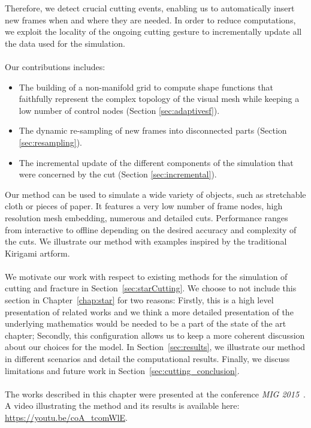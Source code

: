 Therefore, we detect crucial cutting events, enabling us to automatically insert new frames when and where they are needed.
In order to reduce computations, we exploit the locality of the ongoing cutting gesture to incrementally update all the data used for the simulation.
\\ \\
Our contributions includes:
\begin{itemize}
\item The building of a non-manifold grid to compute shape functions that faithfully represent the complex topology of the visual mesh while keeping a low number of control nodes (Section \ref{sec:adaptivesf}).
\item The dynamic re-sampling of new frames into disconnected parts (Section \ref{sec:resampling}).
\item The incremental update of the different components of the simulation that were concerned by the cut (Section \ref{sec:incremental}).
\end{itemize}

Our method can be used to simulate a wide variety of objects, such as stretchable cloth or pieces of paper. 
It features a very low number of frame nodes, high resolution mesh embedding, numerous and detailed cuts. 
Performance ranges from interactive to offline depending on the desired accuracy and complexity of the cuts.
We illustrate our method with examples inspired by the traditional Kirigami artform.
\\ \\
We motivate our work with respect to existing methods for the simulation of cutting and fracture in Section~\ref{sec:starCutting}.
We choose to not include this section in Chapter~\ref{chap:star} for two reasons:
Firstly, this is a high level presentation of related works and we think a more detailed presentation of the underlying mathematics would be needed to be a part of the state of the art chapter;
Secondly, this configuration allows us to keep a more coherent discussion about our choices for the model.
In Section~\ref{sec:results}, we illustrate our method in different scenarios and detail the computational results. 
Finally, we discuss limitations and future work in Section~\ref{sec:cutting_conclusion}. 
\\ \\
The works described in this chapter were presented at the conference \emph{MIG 2015}~\cite{Manteaux2015}.
A video illustrating the method and its results is available here: \url{https://youtu.be/coA_tcomWlE}.

